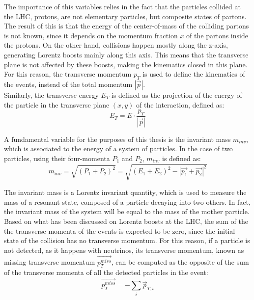 \noindent The importance of this variables relies in the fact that the particles collided at the LHC, protons, are not elementary particles, but composite states of partons.
The result of this is that the energy of the center-of-mass of the colliding partons is not known, since it depends on the momentum fraction $x$ of the partons inside the protons.
On the other hand, collisions happen mostly along the z-axis, generating Lorentz boosts mainly along this axis. This means that the transverse plane is not affected by these boosts, making the kinematics closed in this plane.
For this reason, the transverse momentum $p_T$ is used to define the kinematics of the events, instead of the total momentum $|\Vec{p}|$.\\
Similarly, the transverse energy $E_T$ is defined as the projection of the energy of the particle in the transverse plane $(x,y)$ of the interaction, defined as:
\begin{equation}\label{eq:LHCAtlas/ATLAS/coordinatesystem/ET}
    E_T = E\cdot \frac{p_T}{|\Vec{p}|}
\end{equation}

\noindent A fundamental variable for the purposes of this thesis is the invariant mass $m_{inv}$, which is associated to the energy of a system of particles. In the case of two particles, using their four-momenta $P_1$ and $P_2$, $m_{inv}$ is defined as:
\begin{equation}\label{eq:LHCAtlas/ATLAS/coordinatesystem/minv}
    m_{inv}=\sqrt{(P_1+P_2)^2}=\sqrt{(E_1+E_2)^2-|\Vec{p_1}+\Vec{p_2}|^2}
\end{equation}

\noindent The invariant mass is a Lorentz invariant quantity, which is used to measure the mass of a resonant state, composed of a particle decaying into two others. In fact, the invariant mass of the system will be equal to the mass of the mother particle.\\
Based on what has been discussed on Lorentz boosts at the LHC, the sum of the the transverse momenta of the events is expected to be zero, since the initial state of the collision has no transverse momentum.
For this reason, if a particle is not detected, as it happens with neutrinos, its transverse momentum, known as missing transverse momentum $\Vec{p_T^{miss}}$, can be computed as the opposite of the sum of the transverse momenta of all the detected particles in the event:
\begin{equation}\label{eq:LHCAtlas/ATLAS/coordinatesystem/pTmiss}
    \Vec{p_T^{miss}}=-\sum_i \Vec{p}_{T,i}
\end{equation}

